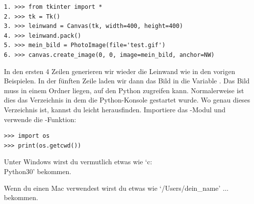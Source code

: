 \begin{Verbatim}[frame=single]
1. >>> from tkinter import *
2. >>> tk = Tk()
3. >>> leinwand = Canvas(tk, width=400, height=400)
4. >>> leinwand.pack()
5. >>> mein_bild = PhotoImage(file='test.gif')
6. >>> canvas.create_image(0, 0, image=mein_bild, anchor=NW)
\end{Verbatim}

In den ersten 4 Zeilen generieren wir wieder die Leinwand wie in den vorigen Beispielen. In der fünften Zeile laden wir dann das Bild in die Variable . Das Bild muss in einem Ordner liegen, auf den Python zugreifen kann. Normalerweise ist dies das Verzeichnis in dem die Python-Konsole gestartet wurde. Wo genau dieses Verzeichnis ist, kannst du leicht herausfinden. Importiere das -Modul und verwende die -Funktion: 

\begin{Verbatim}[frame=single]
>>> import os
>>> print(os.getcwd())
\end{Verbatim}

\begin{WINDOWS}
Unter Windows wirst du vermutlich etwas wie `c:\\Python30' bekommen.
\end{WINDOWS}

\begin{MAC}
Wenn du einen Mac verwendest wirst du etwas wie `/Users/dein\_name' \texorpdfstring{$\ldots$}{...} bekommen. 
\end{MAC}

